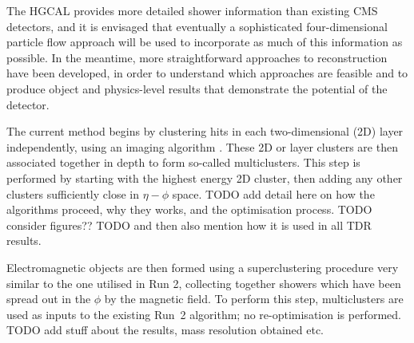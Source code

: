 The HGCAL provides more detailed shower information than existing CMS detectors, 
and it is envisaged that eventually a sophisticated four-dimensional particle flow approach will be used to incorporate as much of this information as possible. 
In the meantime, more straightforward approaches to reconstruction have been developed, 
in order to understand which approaches are feasible and to produce object and physics-level results that demonstrate the potential of the detector. 

The current method begins by clustering hits in each two-dimensional (2D) layer independently, using an imaging algorithm \cite{ClusteringAlgo}.
These 2D or layer clusters are then associated together in depth to form so-called multiclusters. 
This step is performed by starting with the highest energy 2D cluster, then adding any other clusters sufficiently close in $\eta-\phi$ space. 
TODO add detail here on how the algorithms proceed, why they works, and the optimisation process.
TODO consider figures??
TODO and then also mention how it is used in all TDR results.

Electromagnetic objects are then formed using a superclustering procedure very similar to the one utilised in Run 2, 
collecting together showers which have been spread out in the $\phi$ by the magnetic field. 
To perform this step, multiclusters are used as inputs to the existing Run~2 algorithm; no re-optimisation is performed.
TODO add stuff about the results, mass resolution obtained etc.


